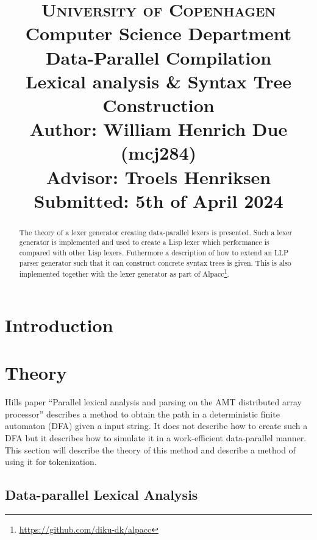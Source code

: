 \documentclass[a4paper,12pt]{article}
\title{
    {\Large \textsc{University of Copenhagen}} \\[0pt]
    {\large Computer Science Department} \\[10pt]
    {\Large Data-Parallel Compilation} \\[4pt]
    {\large Lexical analysis \& Syntax Tree Construction} \\[10pt]
    Author: William Henrich Due (mcj284) \\[0pt]
    Advisor: Troels Henriksen \\[0pt]
    Submitted: 5th of April 2024
}
\author{}
\date{}
\theoremstyle{definition}
\begin{document}
\maketitle
\thispagestyle{firstpage}
\begin{abstract}
    \noindent The theory of a lexer generator creating data-parallel lexers is presented. Such a lexer generator is implemented and used to create a Lisp lexer which performance is compared with other Lisp lexers. Futhermore a description of how to extend an LLP parser generator such that it can construct concrete syntax trees is given. This is also implemented together with the lexer generator as part of Alpacc\footnote{\href{https://github.com/diku-dk/alpacc}{https://github.com/diku-dk/alpacc}}.
\end{abstract}

\tableofcontents

\section{Introduction}


\section{Theory}
Hills paper ``Parallel lexical analysis and parsing on the AMT
distributed array processor'' \cite{HILL1992699} describes a method to obtain the path in a deterministic finite automaton (DFA) given a input string. It does not describe how to create such a DFA but it describes how to simulate it in a work-efficient data-parallel manner. This section will describe the theory of this method and describe a method of using it for tokenization.

\subsection{Data-parallel Lexical Analysis}
\end{document}
